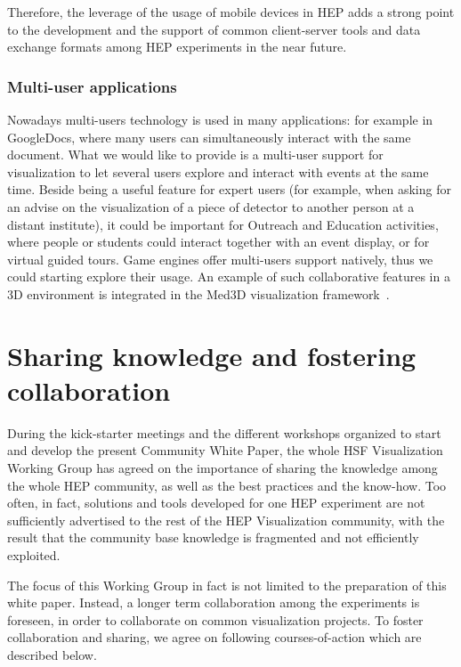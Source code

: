 \documentclass[12pt,a4paper]{article}
\begin{document}
Therefore, the leverage of the usage of mobile devices in HEP adds a strong point to the development and the support of common
client-server tools and data exchange formats among HEP experiments in the near future.

\hypertarget{multi-user}{%
\subsubsection{Multi-user applications}\label{multi-user}}

Nowadays multi-users technology is used in many applications: for example in GoogleDocs, where many users can simultaneously
interact with the same document. What we would like to provide is a multi-user support for visualization to let several users
explore and interact with events at the same time. Beside being a useful feature for expert users (for example, when asking for an advise on the visualization of a piece of detector to another person at a distant institute), it could be important for
Outreach and Education activities, where people or students could interact together with an event display, or for virtual guided tours.
Game engines offer multi-users support natively, thus we could starting explore their usage.
An example of such collaborative features in a 3D environment is integrated in the Med3D visualization framework~\cite{Bohak2017}.

\hypertarget{sharing-knowledge}{%
\section{Sharing knowledge and fostering collaboration}\label{sharing-knowledge}}

During the kick-starter meetings and the different workshops organized to start and develop the present Community White Paper,
the whole HSF Visualization Working Group has agreed on the importance of sharing the knowledge among the whole HEP community,
as well as the best practices and the know-how. Too often, in fact, solutions and tools developed for one HEP experiment are
not sufficiently advertised to the rest of the HEP Visualization community, with the result that the community base knowledge
is fragmented and not efficiently exploited.

The focus of this Working Group in fact is not limited to the preparation of this white paper. Instead, a longer term collaboration
among the experiments is foreseen, in order to collaborate on common visualization projects.
To foster collaboration and sharing, we agree on following courses-of-action which are described below.
\end{document}

